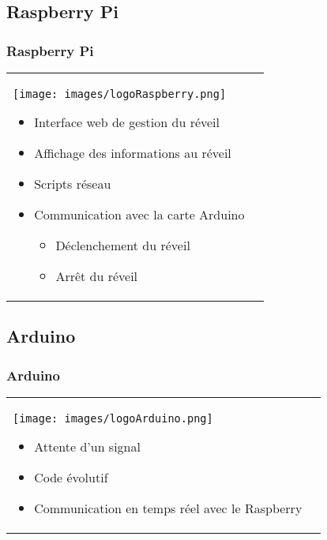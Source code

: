 \documentclass[handout]{beamer}
\begin{document}
	\subsection{Raspberry Pi}
		\begin{frame}
		\frametitle{Raspberry Pi}

		\begin{tabular}{l l}
			\begin{minipage}{0.2\textwidth}
				\begin{center}
					\texttt{[image: images/logoRaspberry.png]}
				\end{center}
			\end{minipage}

			\begin{minipage}{0.8\textwidth}
				\begin{itemize}
					\item Interface web de gestion du réveil
					\item Affichage des informations au réveil
					\item Scripts réseau
					\item Communication avec la carte Arduino
					\begin{itemize}
						\item Déclenchement du réveil 
						\item Arrêt du réveil 
					\end{itemize}
				\end{itemize}
			\end{minipage}
			
		\end{tabular}
		\end{frame}

	\subsection{Arduino}
		\begin{frame}
		\frametitle{Arduino}

		\begin{tabular}{l l}
			\begin{minipage}{0.2\textwidth}
				\begin{center}
					\texttt{[image: images/logoArduino.png]}
				\end{center}
			\end{minipage}

			\begin{minipage}{0.8\textwidth}
				\begin{itemize}
					\item Attente d'un signal
					\item Code évolutif
					\item Communication en temps réel avec le Raspberry
				\end{itemize}
			\end{minipage}
			
		\end{tabular}
		\end{frame}
\end{document}
